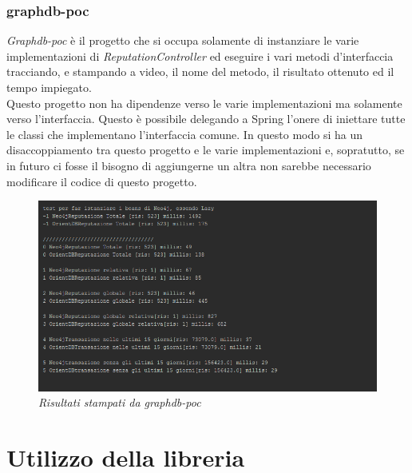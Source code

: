 \subsubsection{graphdb-poc}
\textit{Graphdb-poc} è il progetto che si occupa solamente di instanziare le varie implementazioni di \textit{ReputationController} ed eseguire i vari metodi d'interfaccia tracciando, e stampando a video, il nome del metodo, il risultato ottenuto ed il tempo impiegato.\\
Questo progetto non ha dipendenze verso le varie implementazioni ma solamente verso l'interfaccia. Questo è possibile delegando a Spring l'onere di iniettare tutte le classi che implementano l'interfaccia comune. In questo modo si ha un disaccoppiamento tra questo progetto e le varie implementazioni e, sopratutto, se in futuro ci fosse il bisogno di aggiungerne un altra non sarebbe necessario modificare il codice di questo progetto.
\begin{figure}[!ht]
	\centering
	\includegraphics[scale=0.75]{immagini/poc.png}
	\caption{\textit{Risultati stampati da graphdb-poc}}
\end{figure}
\newpage
\section{Utilizzo della libreria}
